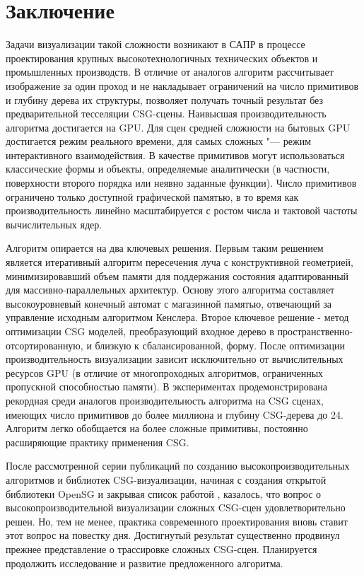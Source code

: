 \section{Заключение} \label{sect_final}

Задачи визуализации такой сложности возникают в САПР в процессе проектирования крупных высокотехнологичных технических объектов и промышленных производств. В отличие от аналогов алгоритм рассчитывает изображение за один проход и не накладывает ограничений на число примитивов и глубину дерева их структуры, позволяет получать точный результат без предварительной тесселяции CSG-сцены. Наивысшая производительность алгоритма достигается на GPU. Для сцен средней сложности на бытовых GPU достигается режим  реального времени, для самых сложных "--- режим интерактивного взаимодействия. В качестве примитивов могут использоваться классические формы и объекты, определяемые аналитически (в частности, поверхности второго порядка или неявно заданные функции). Число примитивов ограничено только доступной графической памятью, в то время как производительность линейно масштабируется с ростом числа и тактовой частоты вычислительных ядер.

Алгоритм опирается на два ключевых решения. Первым таким решением является итеративный алгоритм пересечения луча с конструктивной геометрией, минимизировавший объем памяти для поддержания состояния адаптированный для массивно-параллельных архитектур. Основу этого алгоритма составляет высокоуровневый конечный автомат с магазинной памятью, отвечающий за управление исходным алгоритмом Кенслера. Второе ключевое решение - метод оптимизации CSG моделей, преобразующий входное дерево в пространственно-отсортированную, и близкую к сбалансированной, форму. После оптимизации производительность визуализации зависит исключительно от вычислительных ресурсов GPU (в отличие от многопроходных алгоритмов, ограниченных пропускной способностью памяти). В экспериментах продемонстрирована рекордная среди аналогов производительность алгоритма на CSG сценах, имеющих число примитивов до более миллиона и глубину CSG-дерева до 24. Алгоритм легко обобщается на более сложные примитивы, постоянно расширяющие практику применения CSG.

После рассмотренной серии публикаций по созданию высокопроизводительных алгоритмов и библиотек CSG-визуализации, начиная с создания открытой библиотеки OpenSG  и закрывая список работой \todo{[7]}, казалось, что вопрос о высокопроизводительной визуализации сложных CSG-сцен удовлетворительно решен. Но, тем не менее, практика современного проектирования вновь ставит этот вопрос на повестку дня. Достигнутый результат существенно продвинул прежнее представление о трассировке сложных CSG-сцен. Планируется продолжить исследование и развитие предложенного алгоритма.





